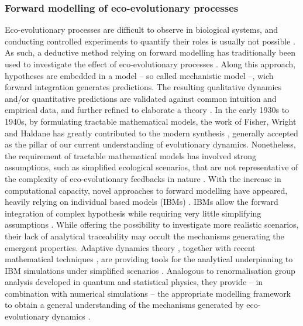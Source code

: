 \subsubsection*{Forward modelling of eco-evolutionary processes}
Eco-evolutionary processes are difficult to observe in biological systems, and conducting controlled experiments to quantify their roles is usually not possible \cite{Pontarp2019}. As such, a deductive method relying on forward modelling has traditionally been used to investigate the effect of eco-evolutionary processes \cite{Brummitt2020}. Along this approach, hypotheses are embedded in a model -- so called mechanistic model \cite{XXX} --, wich forward integration generates predictions. The resulting qualitative dynamics and/or quantitative predictions are validated against common intuition and empirical data, and further refined to elaborate a theory \cite{Sayama,Brummitt2020,Schmidt2009}.
% 
In the early 1930s to 1940s, by formulating tractable mathematical models, the work of Fisher, Wright and Haldane has greatly contributed to the modern synthesis \cite{huxley1942evolution}, generally accepted as the pillar of our current understanding of evolutionary dynamics. Nonetheless, the requirement of tractable mathematical models has involved strong assumptions, such as simplified ecological scenarios, that are not representative of the complexity of eco-evolutionary feedbacks in nature \cite{Govaert2019a}.
% 
With the increase in computational capacity, novel approaches to forward modelling have appeared, heavily relying on individual based models (IBMs) \cite{XXX}. IBMs allow the forward integration of complex hypothesis while requiring very little simplifying assumptions \cite{XXX}. While offering the possibility to investigate more realistic scenarios, their lack of analytical traceability may occult the mechanisms generating the emergent properties.
% 
Adaptive dynamics theory \cite{Metz1995}, together with recent mathematical techniques \cite{Meleard,Nordobtten,Lion}, are providing tools for the analytical underpinning to IBM simulations under simplified scenarios \cite{XXX}. 
% 
% 
Analogous to renormalisation group analysis developed in quantum and statistical physics, they provide -- in combination with numerical simulations -- the appropriate modelling framework to obtain a general understanding of the mechanisms generated by eco-evolutionary dynamics \cite{Levin2002,Govaert2019a}.
